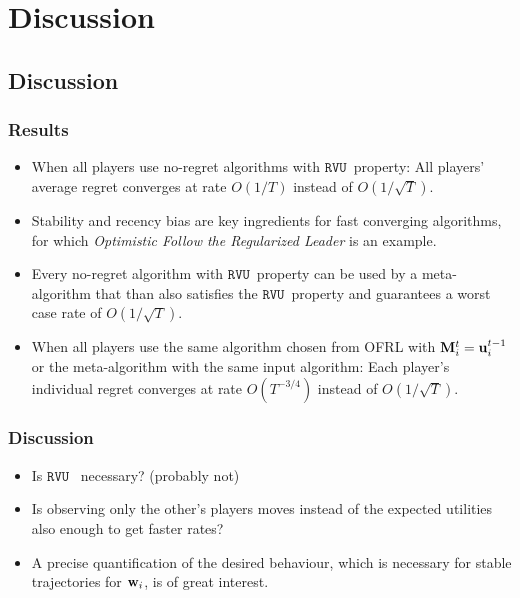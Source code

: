 \documentclass{beamer}
\renewcommand{\vec}[1]{\ensuremath{{\bf #1}}}
\newcommand{\mst}{\ensuremath{w}}
\newcommand{\myprop}{\ensuremath{\texttt{RVU}}}
\begin{document}
\section{Discussion}
\subsection{Discussion}
\begin{frame}
	\frametitle{Results}
		\begin{itemize}
			\item When all players use no-regret algorithms with \myprop~property: All players' average regret converges at rate $O(1/T)$ instead of $O(1/\sqrt{T})$.
			\item Stability and recency bias are key ingredients for fast converging algorithms, for which \textit{Optimistic Follow the Regularized Leader} is an example.
			\item Every no-regret algorithm with \myprop~property can be used by a meta-algorithm that than also satisfies the \myprop~property and guarantees a worst case rate of $O(1/\sqrt{T})$.
			\item When all players use the same algorithm chosen from OFRL with $\vec{M}_i^t = \vec{u}_i^{t-1}$ or the meta-algorithm with the same input algorithm: Each player's individual regret converges at rate $O(T^{-3/4})$ instead of $O(1/\sqrt{T})$.
		\end{itemize}
\end{frame}

\begin{frame}
	\frametitle{Discussion}
		\begin{itemize}
			\item Is \myprop~ necessary? (probably not)
			\item Is observing only the other's players moves instead of the expected utilities also enough to get faster rates?
			\item A precise quantification of the desired behaviour, which is necessary for stable trajectories for $\vec{\mst}_i$, is of great interest.
		\end{itemize}
\end{frame}



\section{}



\begin{frame}
	
\end{frame}
\end{document}

